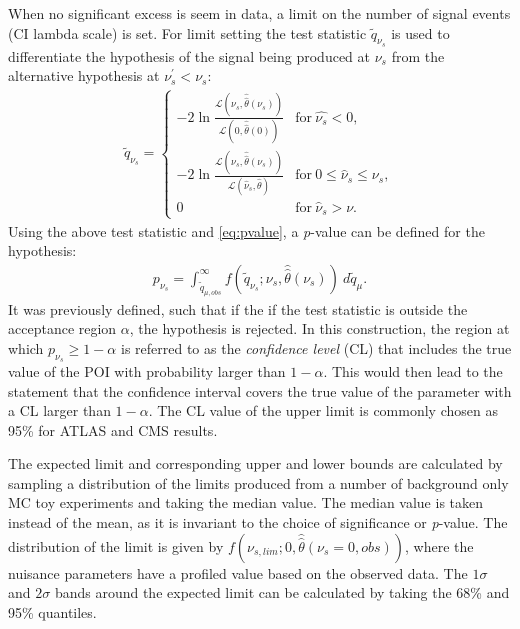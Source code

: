 When no significant excess is seem in data, a limit on the number of signal events (CI lambda scale) is set. For limit setting the test statistic $\tilde{q}_{\nu_s}$ is used to differentiate the hypothesis of the signal being produced at $\nu_s$ from the alternative hypothesis at $\nu_s^\prime < \nu_s$:
\begin{equation}
    \label{eq:limitTestStat}
    \begin{aligned}
    \tilde{q}_{\nu_s} = \begin{cases}
        -2\ln\frac{\mathcal{L}(\nu_s,\hat{\hat{\theta}}(\nu_s))}{\mathcal{L}(0,\hat{\hat{\theta}}(0))} & \mathrm{for }~\hat{\nu_s} < 0, \\
        -2\ln\frac{\mathcal{L}(\nu_s,\hat{\hat{\theta}}(\nu_s))}{\mathcal{L}(\hat{\nu}_s,\hat{\theta})} & \mathrm{for }~0 \leq \hat{\nu}_s \leq \nu_s, \\
        0          & \mathrm{for }~\hat{\nu}_s > \nu.
    \end{cases}
    \end{aligned}
\end{equation}
Using the above test statistic and \cref{eq:pvalue}, a \emph{p}-value can be defined for the hypothesis:
\begin{equation}
    \label{eq:pvalue_sb}
    \begin{aligned}
        p_{\nu_s} = \int_{\tilde{q}_{\mu,obs}}^\infty f(\tilde{q}_{\nu_s};\nu_s,\hat{\hat{\theta}}(\nu_s))~d\tilde{q}_\mu.
    \end{aligned}
\end{equation}
It was previously defined, such that if the if the test statistic is outside the acceptance region $\alpha$, the hypothesis is rejected. In this construction, the region at which $p_{\nu_s} \geq 1 - \alpha$ is referred to as the \emph{confidence level} (CL) that includes the true value of the POI with probability larger than $1-\alpha$. This would then lead to the statement that the confidence interval covers the true value of the parameter with a CL larger than $1-\alpha$. The CL value of the upper limit is commonly chosen as 95\% for ATLAS and CMS results. 

The expected limit and corresponding upper and lower bounds are calculated by sampling a distribution of the limits produced from a number of background only MC toy experiments and taking the median value. The median value is taken instead of the mean, as it is invariant to the choice of significance or \emph{p}-value. The distribution of the limit is given by $f(\nu_{s,lim};0,\hat{\hat{\theta}}(\nu_s = 0,obs))$, where the nuisance parameters have a profiled value based on the observed data. The $1\sigma$ and $2\sigma$ bands around the expected limit can be calculated by taking the 68\% and 95\% quantiles. 

